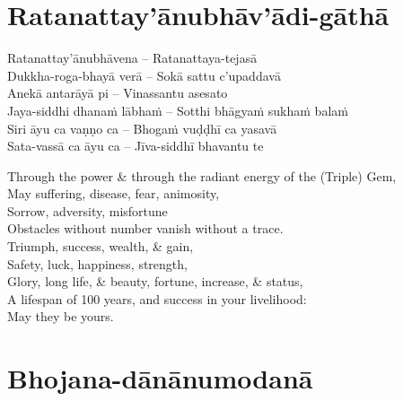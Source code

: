 \suttaRef{[Dhp 109]}

\setsecheadstyle{\subsectionFmt}
\section{Ratanattay'ānubhāv'ādi-gāthā}
\label{ratanattayanubhavadi-gatha}

\vspace{-0.6em}

\begin{pali-hang}
  Ratanattay'ānubhāvena – Ratanattaya-tejasā\\
  Dukkha-roga-bhayā verā – Sokā sattu c'upaddavā\\
  Anekā antarāyā pi – Vinassantu asesato\\
  Jaya-siddhi dhanaṁ lābhaṁ – Sotthi bhāgyaṁ sukhaṁ balaṁ\\
  Siri āyu ca vaṇṇo ca – Bhogaṁ vuḍḍhī ca yasavā\\
  Sata-vassā ca āyu ca – Jīva-siddhī bhavantu te
\end{pali-hang}

\begin{english-verses}
  Through the power \& through the radiant energy of the (Triple) Gem,\\
  May suffering, disease, fear, animosity,\\
  Sorrow, adversity, misfortune\\
  Obstacles without number vanish without a trace.\\
  Triumph, success, wealth, \& gain,\\
  Safety, luck, happiness, strength,\\
  Glory, long life, \& beauty, fortune, increase, \& status,\\
  A lifespan of 100 years, and success in your livelihood:\\
  May they be yours.
\end{english-verses}

\suttaRef{[Thai]}

\section{Bhojana-dānānumodanā}
\label{bhojana-dananumodana}

\vspace{-0.6em}

